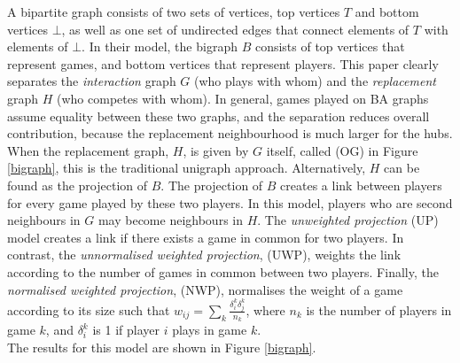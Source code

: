  
 A bipartite graph consists of two sets of vertices, top vertices $T$ and bottom vertices $\bot$, as well as one set of undirected edges that connect elements of $T$ with elements of $\bot$. In their model, the bigraph $B$ consists of top vertices that represent games, and bottom vertices that represent players. This paper clearly separates the \emph{interaction} graph $G$ (who plays with whom) and the \emph{replacement} graph $H$ (who competes with whom). In general, games played on BA graphs assume equality between these two graphs, and the separation reduces overall contribution, because the replacement neighbourhood is much larger for the hubs.  \\
 
When the replacement graph, $H$, is given by $G$ itself, called (OG) in Figure \ref{bigraph}, this is the traditional unigraph approach. Alternatively, $H$ can be found as the projection of $B$. The projection of $B$ creates a link between players for every game played by these two players. In this model, players who are second neighbours in $G$ may become neighbours in $H$. The \emph{unweighted projection} (UP) model creates a link if there exists a game in common for two players. In contrast, the \emph{unnormalised weighted projection}, (UWP), weights the link according to the number of games in common between two players. Finally, the \emph{normalised weighted projection}, (NWP), normalises the weight of a game according to its size such that $w_{ij} = \sum_k \frac{\delta_i^k\delta_j^k}{n_k}$, where $n_k$ is the number of players in game $k$, and $\delta_i^k$ is 1 if player $i$ plays in game $k$. \\

The results for this model are shown in Figure \ref{bigraph}. \\

 
 
 
 
 
